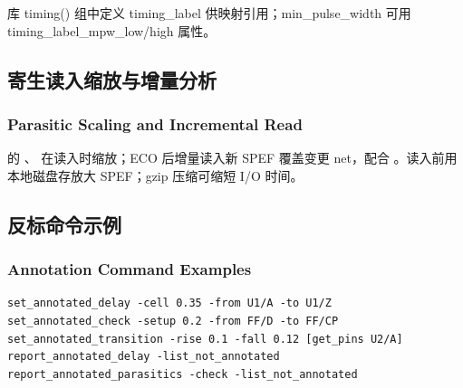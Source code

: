 库 timing() 组中定义 timing\_label 供映射引用；min\_pulse\_width 可用 timing\_label\_mpw\_low/high 属性。

\subsection{寄生读入缩放与增量分析}
\subsubsection*{Parasitic Scaling and Incremental Read}

 的 、 在读入时缩放；ECO 后增量读入新 SPEF 覆盖变更 net，配合 。读入前用本地磁盘存放大 SPEF；gzip 压缩可缩短 I/O 时间。

\subsection{反标命令示例}
\subsubsection*{Annotation Command Examples}

\begin{lstlisting}
set_annotated_delay -cell 0.35 -from U1/A -to U1/Z
set_annotated_check -setup 0.2 -from FF/D -to FF/CP
set_annotated_transition -rise 0.1 -fall 0.12 [get_pins U2/A]
report_annotated_delay -list_not_annotated
report_annotated_parasitics -check -list_not_annotated
\end{lstlisting}

